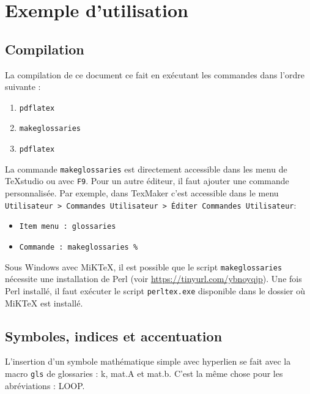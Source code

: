 \documentclass[PhD,nohyperref,english,french]{ulthese}
\begin{document}
\frontmatter                    %

\pagetitre

\begin{SingleSpace}
\abnormalparskip{0pt}
\printglossary[title=Nomenclature]
\end{SingleSpace}
\cleardoublepage

\mainmatter                     %

\chapter{Exemple d'utilisation}

\section{Compilation}
La compilation de ce document ce fait en exécutant les commandes dans l'ordre suivante :
\begin{enumerate}
	\item \texttt{pdflatex}
	\item \texttt{makeglossaries}
	\item \texttt{pdflatex}
\end{enumerate}
La commande \texttt{makeglossaries} est directement accessible dans les menu de TeXstudio ou avec \texttt{F9}. Pour un autre éditeur, il faut ajouter une commande personnalisée. Par exemple, dans TexMaker c’est accessible dans le menu \texttt{Utilisateur > Commandes Utilisateur > Éditer Commandes Utilisateur}:
\begin{itemize}
	\item \texttt{Item menu : glossaries} 
	\item \texttt{Commande : makeglossaries \%}
\end{itemize}
Sous Windows avec MiKTeX, il est possible que le script \texttt{makeglossaries} nécessite une installation de Perl (voir \url{https://tinyurl.com/ybnoyqjp}). Une fois Perl installé, il faut exécuter le script \texttt{perltex.exe} disponible dans le dossier où MiKTeX est installé.

\section{Symboles, indices et accentuation}
L'insertion d'un symbole mathématique simple avec hyperlien se fait avec la macro \texttt{gls} de glossaries : \gls{k}, \gls{mat.A} et \gls{mat.b}. C'est la même chose pour les abréviations : \gls{LOOP}. 
\end{document}
